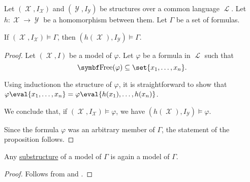 \begin{proposition}\label{thm:first_order_homomorphism_preserves_models}\mcite\cite[def. 23.8]{OpenLogic20201202}
  Let \( (\mscrX, I_{\mscrX}) \) and \( (\mscrY, I_{\mscrY}) \) be structures over a common language \( \mscrL \). Let \( h: \mscrX \to \mscrY \) be a homomorphism between them. Let \( \Gamma \) be a set of formulas.

  If \( (\mscrX, I_{\mscrX}) \models \Gamma \), then \( (h(\mscrX), I_{\mscrY}) \models \Gamma \).
\end{proposition}
\begin{proof}
  Let \( (\mscrX, I) \) be a model of \( \varphi \). Let \( \varphi \) be a formula in \( \mscrL \) such that
  \begin{equation*}
    \bfop{Free}(\varphi) \subseteq \set{x_1, \ldots, x_n}.
  \end{equation*}

  Using induction\IND on the structure of \( \varphi \), it is straightforward to show that \( \varphi\eval{x_1, \ldots, x_n} = \varphi\eval{h(x_1), \ldots, h(x_n)} \).

  We conclude that, if \( (\mscrX, I_{\mscrX}) \models \varphi \), we have \( (h(\mscrX), I_{\mscrY}) \models \varphi \).

  Since the formula \( \varphi \) was an arbitrary member of \( \Gamma \), the statement of the proposition follows.
\end{proof}

\begin{corollary}\label{thm:substructure_is_model}
  Any \hyperref[def:first_order_substructure]{substructure} of a model of \( \Gamma \) is again a model of \( \Gamma \).
\end{corollary}
\begin{proof}
  Follows from  and .
\end{proof}

\begin{remark}\label{rem:induction}
\end{remark}

\begin{definition}\label{def:first_order_model_category}
\end{definition}
